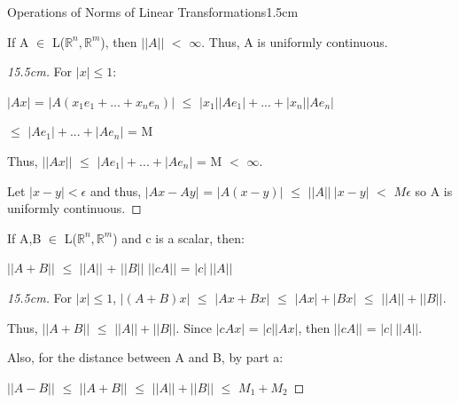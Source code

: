     \begin{ltheorem}{Operations of Norms of Linear Transformations}{1.5cm}
        \item If A $\in$ L($\mathbb{R}^n,\mathbb{R}^m$), then $||A||$ $<$ $\infty$.
            Thus, A is uniformly continuous.
            
            \begin{proof}[15.5cm]
                For $|x| \leq 1$:

                \hspace{0.5cm}
                $|Ax|$
                = $|A(x_1e_1 + ... + x_ne_n)|$
                $\leq$ $|x_1| |Ae_1| + ... + |x_n| |Ae_n|$

                \hspace{1.4cm}
                $\leq$ $|Ae_1| + ... + |Ae_n|$
                = M

                Thus,
                $||Ax||$ $\leq$ $|Ae_1| + ... + |Ae_n|$ = M $<$ $\infty$.

                Let $|x-y| < \epsilon$ and thus,
                $|Ax - Ay|$
                = $|A(x-y)|$
                $\leq$ $||A|| \ |x-y|$
                $<$ $M\epsilon$ so A is uniformly continuous.
            \end{proof}

        \item If A,B $\in$ L($\mathbb{R}^n,\mathbb{R}^m$) and c is a scalar, then:
        
            \hspace{0.5cm}
            $||A+B||$ $\leq$ $||A||$ + $||B||$
            \hspace{1cm}
            $||cA||$ = $|c| \ ||A||$

            \begin{proof}[15.5cm]
                For $|x| \leq 1$,
                $|(A+B)x|$
                $\leq$ $|Ax+Bx|$
                $\leq$ $|Ax| + |Bx|$
                $\leq$ $||A|| + ||B||$.

                Thus, $||A+B||$ $\leq$ $||A|| + ||B||$.
                Since $|cAx|$ = $|c| |Ax|$, then $||cA||$ = $|c| \ ||A||$.

                Also, for the distance between A and B, by part a:

                \hspace{0.5cm}
                $||A-B||$
                $\leq$ $||A+B||$
                $\leq$ $||A|| + ||B||$
                $\leq$ $M_1 + M_2$
            \end{proof}


\end{ltheorem}
